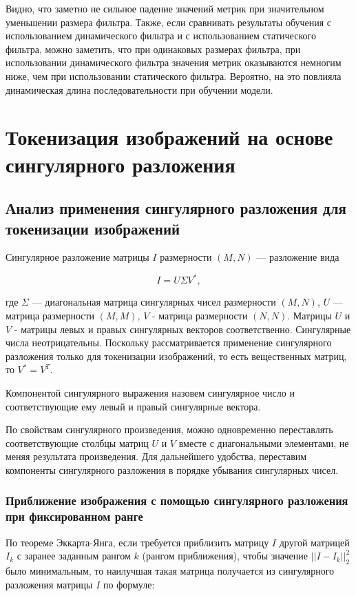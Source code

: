 \documentclass[times,specification,annotation]{itmo-student-thesis}
\begin{document}
Видно, что заметно не сильное падение значений метрик при значительном уменьшении размера фильтра. Также, если сравнивать результаты обучения с использованием динамического фильтра и с использованием статического фильтра, можно заметить, что при одинаковых размерах фильтра, при использовании динамического фильтра значения метрик оказываются немногим ниже, чем при использовании статического фильтра. Вероятно, на это повлияла динамическая длина последовательности при обучении модели.


\section{Токенизация изображений на основе сингулярного разложения}

\subsection{Анализ применения сингулярного разложения для токенизации изображений}

Сингулярное разложение матрицы $I$ размерности $(M, N)$ --- разложение вида 

$$
I = U\Sigma V^*,
$$

где $\Sigma$ --- диагональная матрица сингулярных чисел размерности $(M, N)$, $U$ --- матрица размерности $(M, M)$, $V$ - матрица размерности $(N, N)$. Матрицы $U$ и $V$ - матрицы левых и правых сингулярных векторов соответственно. Сингулярные числа неотрицательны. Поскольку рассматривается применение сингулярного разложения только для токенизации изображений, то есть вещественных матриц, то $V^* = V^T$.

Компонентой сингулярного выражения назовем сингулярное число и соответствующие ему левый и правый сингулярные вектора.

По свойствам сингулярного произведения, можно одновременно переставлять соответствующие столбцы матриц $U$ и $V$ вместе с диагональными элементами, не меняя результата произведения. Для дальнейшего удобства, переставим компоненты сингулярного разложения в порядке убывания сингулярных чисел.

\subsubsection{Приближение изображения с помощью сингулярного разложения при фиксированном ранге}

По теореме Эккарта-Янга\cite{eckart_young}, если требуется приблизить матрицу $I$ другой матрицей $I_k$ с заранее заданным рангом $k$ (рангом приближения), чтобы значение $||I - I_k||_2^2$ было минимальным, то наилучшая такая матрица получается из сингулярного разложения матрицы $I$ по формуле:
\end{document}
